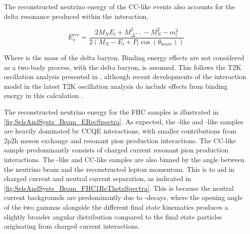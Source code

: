 The reconstructed neutrino energy of the CC\quickmath{1\pi^{+}}-like events also accounts for the delta resonance produced within the interaction,

\begin{equation}
  \label{sec:SelsAndSysts_Erec_CCRES}
  E^{rec}_{\nu} = \frac{2M_{N}E_{l} + M_{\Delta^{++}}^{2} - M_{N}^{2} - m_{l}^{2}}{2(M_{N} - E_{l} + P_{l}\cos(\theta_{beam}))}
\end{equation}

Where  is the mass of the delta baryon. Binding energy effects are not considered as a two-body process, with the delta baryon, is assumed. This follows the T2K oscillation analysis presented in \cite{Dunne2020-uf}, although recent developments of the interaction model in the latest T2K oscillation analysis do include effects from binding energy in this calculation \cite{t2k_tn_414}.

The reconstructed neutrino energy for the FHC samples is illustrated in \autoref{fig:SelsAndSysts_Beam_ERecSpectra}. As expected, the -like and -like samples are heavily dominated by CCQE interactions, with smaller contributions from 2p2h meson exchange and resonant pion production interactions. The CC\quickmath{1\pi^{+}}-like sample predominantly consists of charged current resonant pion production interactions. The -like and CC\quickmath{1\pi^{+}}-like samples are also binned by the angle between the neutrino beam and the reconstructed lepton momentum. This is to aid in charged current and neutral current separation, as indicated in \autoref{fig:SelsAndSysts_Beam_FHC1ReThetaSpectra}. This is because the neutral current backgrounds are predominantly due to -decays, where the opening angle of the two gammas alongside the different final state kinematics produces a slightly broader angular distribution compared to the final state particles originating from charged current  interactions.

